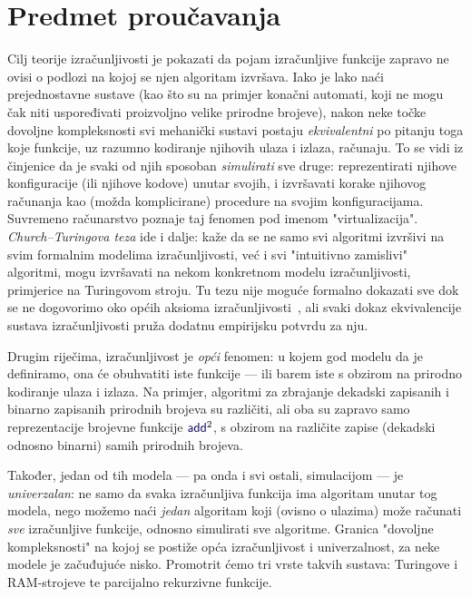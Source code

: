 \section[]{Predmet proučavanja}

Cilj teorije izračunljivosti je pokazati da pojam izračunljive funkcije zapravo ne ovisi o podlozi na kojoj se njen algoritam izvršava. Iako je lako naći prejednostavne sustave (kao što su na primjer konačni automati, koji ne mogu čak niti uspoređivati proizvoljno velike prirodne brojeve), nakon neke točke dovoljne kompleksnosti svi mehanički sustavi postaju \emph{ekvivalentni} po pitanju toga koje funkcije, uz razumno kodiranje njihovih ulaza i izlaza, računaju. To se vidi iz činjenice da je svaki od njih sposoban \emph{simulirati} sve druge: reprezentirati njihove konfiguracije (ili njihove kodove) unutar svojih, i izvršavati korake njihovog računanja kao (možda komplicirane) procedure na svojim konfiguracijama. Suvremeno računarstvo poznaje taj fenomen pod imenom "virtualizacija". \emph{Church--\!Turingova teza} ide i dalje: kaže da se ne samo svi algoritmi izvršivi na svim formalnim modelima izračunljivosti, već i svi "intuitivno zamislivi" algoritmi, mogu izvršavati na nekom konkretnom modelu izračunljivosti, primjerice na Turingovom stroju. Tu tezu nije moguće formalno dokazati sve dok se ne dogovorimo oko općih aksioma izračunljivosti~\cite{dershowitz}, ali svaki dokaz ekvivalencije sustava izračunljivosti pruža dodatnu empirijsku potvrdu za nju.

Drugim riječima, izračunljivost je \emph{opći} fenomen: u kojem god modelu da je definiramo, ona će obuhvatiti iste funkcije --- ili barem iste s obzirom na prirodno kodiranje ulaza i izlaza. Na primjer, algoritmi za zbrajanje dekadski zapisanih i binarno zapisanih prirodnih brojeva su različiti, ali oba su zapravo samo reprezentacije brojevne funkcije $\f{add}^2$, s obzirom na različite zapise (dekadski odnosno binarni) samih prirodnih brojeva.

Također, jedan od tih modela --- pa onda i svi ostali, simulacijom --- je \emph{univerzalan}: ne samo da svaka izračunljiva funkcija ima algoritam unutar tog modela, nego možemo naći \emph{jedan} algoritam koji (ovisno o ulazima) može računati \emph{sve} izračunljive funkcije, odnosno simulirati sve algoritme. Granica "dovoljne kompleksnosti" na kojoj se postiže opća izračunljivost i univerzalnost, za neke modele je začuđujuće nisko. Promotrit ćemo tri vrste takvih sustava: Turingove i RAM-strojeve te parcijalno rekurzivne funkcije.

